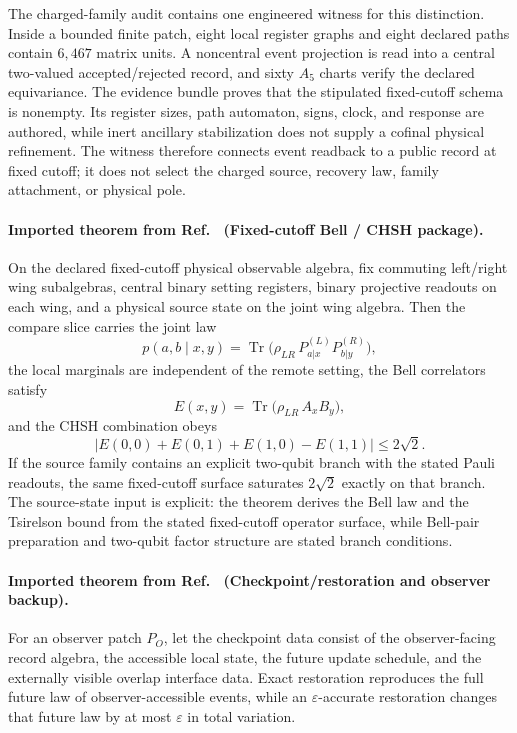 The charged-family audit contains one engineered witness for this distinction. Inside a bounded
finite patch, eight local register graphs and eight declared paths contain \(6{,}467\) matrix
units. A noncentral event projection is read into a central two-valued accepted/rejected record,
and sixty \(A_5\) charts verify the declared equivariance. The evidence bundle proves that the
stipulated fixed-cutoff schema is nonempty. Its register sizes, path automaton, signs, clock, and
response are authored, while inert ancillary stabilization does not supply a cofinal physical
refinement. The witness therefore connects event readback to a public record at fixed cutoff; it
does not select the charged source, recovery law, family attachment, or physical pole.

\paragraph{Imported theorem from Ref.~\cite{ophmicrophysics} (Fixed-cutoff Bell / CHSH package).}
On the declared fixed-cutoff physical observable algebra, fix commuting left/right wing
subalgebras, central binary setting registers, binary projective readouts on each wing, and a
physical source state on the joint wing algebra. Then the compare slice carries the joint law
\[
p(a,b\mid x,y)
=
\operatorname{Tr}\!\bigl(\rho_{LR}\,P_{a|x}^{(L)}P_{b|y}^{(R)}\bigr),
\]
the local marginals are independent of the remote setting, the Bell correlators satisfy
\[
E(x,y)=\operatorname{Tr}\!\bigl(\rho_{LR}\,A_xB_y\bigr),
\]
and the CHSH combination obeys
\[
\bigl|E(0,0)+E(0,1)+E(1,0)-E(1,1)\bigr|
\le
2\sqrt2.
\]
If the source family contains an explicit two-qubit branch with the stated Pauli readouts, the
same fixed-cutoff surface saturates \(2\sqrt2\) exactly on that branch. The source-state input
is explicit: the theorem derives the Bell law and the Tsirelson bound from the stated
fixed-cutoff operator surface, while Bell-pair preparation and two-qubit factor structure are
stated branch conditions.

\paragraph{Imported theorem from Ref.~\cite{ophmicrophysics} (Checkpoint/restoration and observer backup).}
For an observer patch \(P_O\), let the checkpoint data consist of the observer-facing record
algebra, the accessible local state, the future update schedule, and the externally visible
overlap interface data. Exact restoration reproduces the full future law of observer-accessible
events, while an \(\varepsilon\)-accurate restoration changes that future law by at most
\(\varepsilon\) in total variation.

